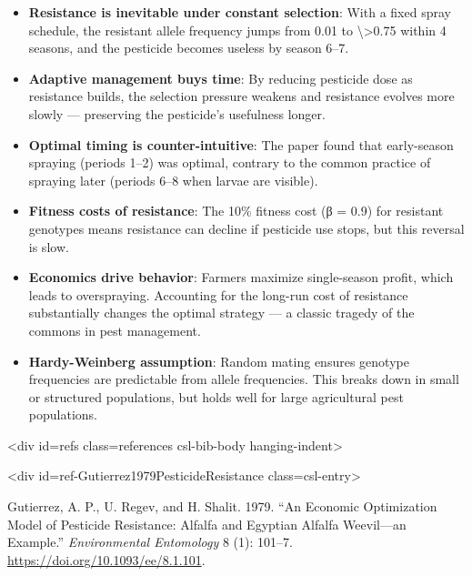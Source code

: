 \begin{itemize}
\item[1. ] \textbf{Resistance is inevitable under constant selection}: With a fixed  spray schedule, the resistant allele frequency jumps from 0.01 to  {\textbackslash}>0.75 within 4 seasons, and the pesticide becomes useless by season  6–7.


\item[2. ] \textbf{Adaptive management buys time}: By reducing pesticide dose as  resistance builds, the selection pressure weakens and resistance  evolves more slowly — preserving the pesticide’s usefulness longer.


\item[3. ] \textbf{Optimal timing is counter-intuitive}: The paper found that  early-season spraying (periods 1–2) was optimal, contrary to the  common practice of spraying later (periods 6–8 when larvae are  visible).


\item[4. ] \textbf{Fitness costs of resistance}: The 10\% fitness cost (β = 0.9) for  resistant genotypes means resistance can decline if pesticide use  stops, but this reversal is slow.


\item[5. ] \textbf{Economics drive behavior}: Farmers maximize single-season profit,  which leads to overspraying. Accounting for the long-run cost of  resistance substantially changes the optimal strategy — a classic  tragedy of the commons in pest management.


\item[6. ] \textbf{Hardy-Weinberg assumption}: Random mating ensures genotype  frequencies are predictable from allele frequencies. This breaks  down in small or structured populations, but holds well for large  agricultural pest populations.

\end{itemize}


<div id={\textquotedbl}refs{\textquotedbl} class={\textquotedbl}references csl-bib-body hanging-indent{\textquotedbl}>



<div id={\textquotedbl}ref-Gutierrez1979PesticideResistance{\textquotedbl} class={\textquotedbl}csl-entry{\textquotedbl}>



Gutierrez, A. P., U. Regev, and H. Shalit. 1979. “An Economic Optimization Model of Pesticide Resistance: Alfalfa and Egyptian Alfalfa Weevil—an Example.” \emph{Environmental Entomology} 8 (1): 101–7. \href{https://doi.org/10.1093/ee/8.1.101}{https://doi.org/10.1093/ee/8.1.101}.



